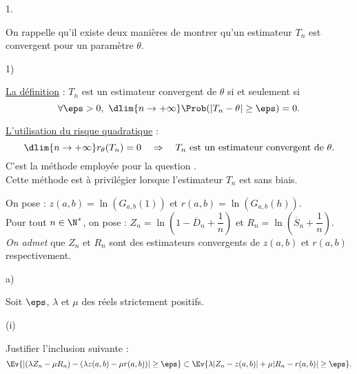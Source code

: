\begin{noliste}{1.}
  \newpage
  
  
  
  \begin{remark}%
    On rappelle qu'il existe deux manières de montrer qu'un estimateur 
    $T_n$ est convergent pour un paramètre $\theta$.
    \begin{noliste}{1)}
    \item \underline{La définition} : $T_n$ est un estimateur convergent 
    de $\theta$ si et seulement si
    \[
    \forall \eps>0, \ \dlim{n\to+\infty} \Prob(\vert 
    T_n-\theta\vert \geq \eps)=0.
    \]
    \item \underline{L'utilisation du risque quadratique} : 
    \[
    \dlim{n\to+\infty} r_\theta(T_n)=0 \quad \Rightarrow \quad
    \mbox{$T_n$ est un estimateur convergent de $\theta$.}
    \]
    C'est la méthode employée pour la question .\\
    Cette méthode est à privilégier lorsque l'estimateur $T_n$ est sans 
    biais.
    \end{noliste}
    \end{remark}


\item On pose : $z(a,b)=\ln(G_{a,b}(1))$ et $r(a,b)=\ln(G_{a,b}(h))$.\\
  Pour tout $n\in\N^*$, on pose : $Z_n = \ln\left(1-\overline{D}_n
    +\dfrac{1}{n}\right)$ et $R_n =
  \ln\left(\overline{S}_n+\dfrac{1}{n}\right)$.\\
  {\it On admet} que $Z_n$ et $R_n$ sont des estimateurs convergents
  de $z(a,b)$ et $r(a,b)$ respectivement.
  \begin{noliste}{a)}
    \setlength{\itemsep}{2mm}
  \item Soit $\eps$, $\lambda$ et $\mu$ des réels strictement
    positifs.
    \begin{noliste}{(i)}
    \item Justifier l'inclusion suivante :
      \[
      \Ev{ \left\vert (\lambda Z_n-\mu R_n) - (\lambda z(a,b) -\mu
          r(a,b))\right\vert \geq \eps} \subset \Ev{\lambda
        \vert Z_n - z(a,b)\vert + \mu \vert R_n-r(a,b)\vert \geq
        \eps}.
      \]
      

\end{noliste}
\end{noliste}
\end{noliste}
